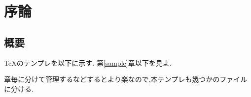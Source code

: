 \chapter{序論} \label{cha:introduction}

\section{概要}
TeXのテンプレを以下に示す.
第\ref{sample}章以下を見よ.

章毎に分けて管理するなどするとより楽なので,本テンプレも幾つかのファイルに分ける.


